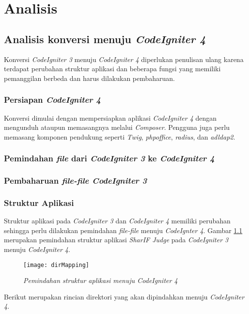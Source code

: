 \chapter{Analisis}
\label{chap:analisis}
\section{Analisis konversi menuju \textit{CodeIgniter 4}}
Konversi \textit{CodeIgniter 3} menuju \textit{CodeIgniter 4} diperlukan penulisan ulang karena terdapat perubahan struktur aplikasi dan beberapa fungsi yang memiliki pemanggilan berbeda dan harus dilakukan pembaharuan.
\subsection{Persiapan \textit{CodeIgniter 4}} Konversi dimulai dengan mempersiapkan aplikasi \textit{CodeIgniter 4} dengan mengunduh ataupun memasangnya melalui \textit{Composer}. Pengguna juga perlu memasang komponen pendukung seperti \textit{Twig}, \textit{phpoffice}, \textit{radius}, dan \textit{adldap2}.
\subsection{Pemindahan \textit{file} dari \textit{CodeIgniter 3} ke \textit{CodeIgniter 4}}

\subsection{Pembaharuan \textit{file-file CodeIgniter 3} }

\subsection{Struktur Aplikasi}
Struktur aplikasi pada \textit{CodeIgniter 3} dan \textit{CodeIgniter 4} memiliki perubahan sehingga perlu dilakukan pemindahan \textit{file-file} menuju \textit{CodeIgnter 4}. Gambar \ref{fig:dirMapping} merupakan pemindahan struktur aplikasi \textit{SharIF Judge} pada \textit{CodeIgniter 3} menuju \textit{CodeIgniter 4}.
\begin{figure}[H]
	\centering  
	\texttt{[image: dirMapping]}  
	\caption[\textit{Pemindahan struktur aplikasi menuju \textit{CodeIgniter 4}}]{\textit{Pemindahan struktur aplikasi menuju \textit{CodeIgniter 4}}} 
	\label{fig:dirMapping} 
\end{figure} 

Berikut merupakan rincian direktori yang akan dipindahkan menuju \textit{CodeIgniter 4}.
